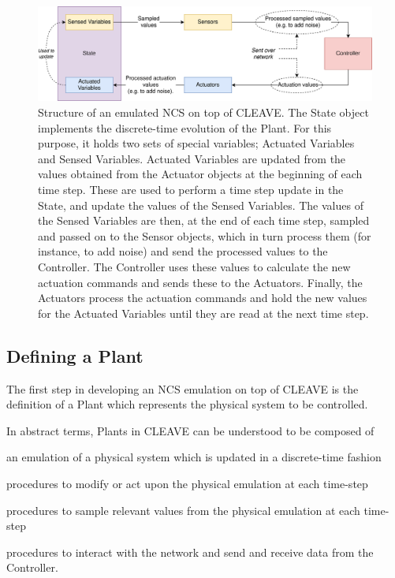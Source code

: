 \begin{figure}
    \centering
    \includegraphics[width=\textwidth]{images/CLEAVE_NCS_structure.png}
    \caption{
        Structure of an emulated \ac{NCS} on top of CLEAVE.
        The State object implements the discrete-time evolution of the Plant.
        For this purpose, it holds two sets of special variables; Actuated Variables and Sensed Variables.
        Actuated Variables are updated from the values obtained from the Actuator objects at the beginning of each time step.
        These are used to perform a time step update in the State, and update the values of the Sensed Variables.
        The values of the Sensed Variables are then, at the end of each time step, sampled and passed on to the Sensor objects, which in turn process them (for instance, to add noise) and send the processed values to the Controller.
        The Controller uses these values to calculate the new actuation commands and sends these to the Actuators.
        Finally, the Actuators process the actuation commands and hold the new values for the Actuated Variables until they are read at the next time step.
    }\label{fig:cleave:ncs:struct}
\end{figure}

\subsection{Defining a Plant}

The first step in developing an \ac{NCS} emulation on top of CLEAVE is the definition of a Plant which represents the physical system to be controlled.

In abstract terms, Plants in CLEAVE can be understood to be composed of
\begin{enumerate*}[itemjoin={{; }}, itemjoin*={{; and }}]
    \item\label{item:plant:state} an emulation of a physical system which is updated in a discrete-time fashion
    \item\label{item:plant:actuators} procedures to modify or act upon the physical emulation at each time-step
    \item\label{item:plant:sensors} procedures to sample relevant values from the physical emulation at each time-step
    \item\label{item:plant:network} procedures to interact with the network and send and receive data from the Controller.
\end{enumerate*}

